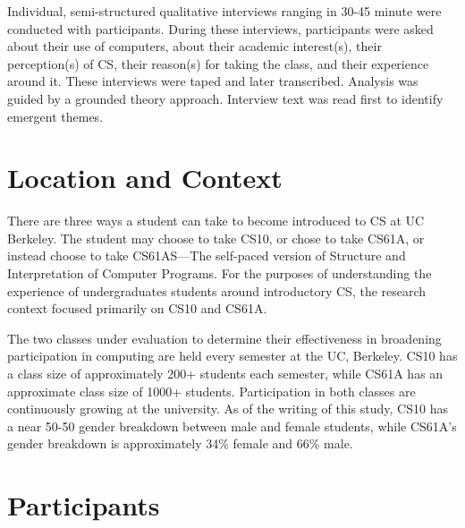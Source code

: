 \documentclass[twoside,openright,titlepage,numbers=noenddot,headinclude,%
               footinclude=true,cleardoublepage=empty,abstractoff,BCOR=5mm,%
               paper=a4,fontsize=11pt,ngerman,american]{scrreprt}
\numberwithin{theorem}{chapter}
\numberwithin{definition}{chapter}
\numberwithin{algorithm}{chapter}
\numberwithin{figure}{chapter}
\numberwithin{table}{chapter}
\numberwithin{equation}{chapter}
\begin{document}
Individual, semi-structured qualitative interviews ranging in 30-45 minute were conducted with participants. During these interviews, participants were asked about their use of computers, about their academic interest(s), their perception(s) of CS, their reason(s) for taking the class, and their experience around it. These interviews were taped and later transcribed. Analysis was guided by a grounded theory approach. Interview text was read first to identify emergent themes.


\section *{Location and Context}
There are three ways a student can take to become introduced to CS at UC Berkeley. The student may choose to take CS10, or chose to take CS61A, or instead choose to take CS61AS---The self-paced version of Structure and Interpretation of Computer Programs. For the purposes of understanding the experience of undergraduates students around introductory CS, the research context focused primarily on CS10 and CS61A.  

The two classes under evaluation to determine their effectiveness in broadening participation in computing are held every semester at the UC, Berkeley. CS10 has a class size of approximately 200+ students each semester, while CS61A has an approximate class size of 1000+ students. Participation in both classes are continuously growing at the university. As of the writing of this study, CS10 has a near 50-50 gender breakdown between male and female students, while CS61A's gender breakdown is approximately 34\% female and 66\% male.


\section *{Participants}
\end{document}
